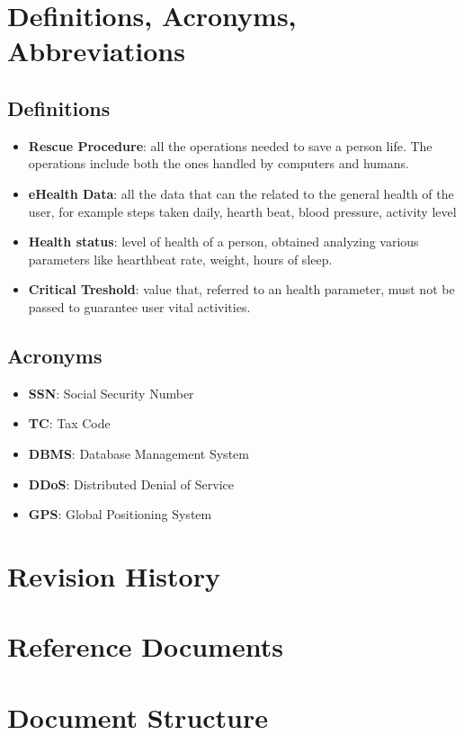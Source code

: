 \section{Definitions, Acronyms, Abbreviations}
\subsection{Definitions}
\begin{itemize}
\item \textbf{Rescue Procedure}: all the operations needed to save a person life. The operations include both the ones handled by computers and humans.
\item \textbf{eHealth Data}: all the data that can the related to the general health of the user, for example steps taken daily, hearth beat, blood pressure, activity level
\item \textbf{Health status}: level of health of a person, obtained analyzing various parameters like  hearthbeat rate, weight, hours of sleep.
\item \textbf{Critical Treshold}: value that, referred to an health parameter, must not be passed to guarantee user vital activities.
\end{itemize}




\subsection{Acronyms}

\begin{itemize}
\item \textbf{SSN}: Social Security Number
\item \textbf{TC}: Tax Code
\item \textbf{DBMS}: Database Management System
\item \textbf{DDoS}: Distributed Denial of Service
\item \textbf{GPS}: Global Positioning System
\end{itemize}




\section{Revision History}
\section{Reference Documents}
\section{Document Structure}
